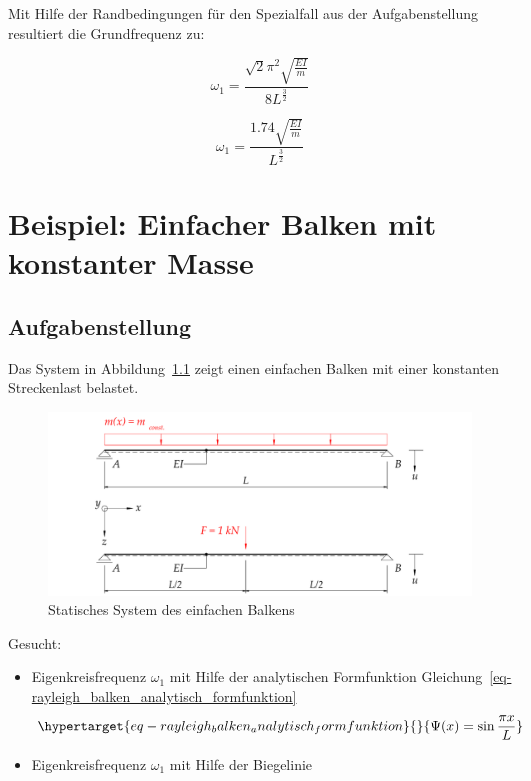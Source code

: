 \documentclass[
  letterpaper,
  DIV=11]{scrreprt}
\providecommand{\tightlist}{%
  \setlength{\itemsep}{0pt}\setlength{\parskip}{0pt}}\usepackage{longtable,booktabs,array}
\begin{document}
Mit Hilfe der Randbedingungen für den Spezialfall aus der
Aufgabenstellung resultiert die Grundfrequenz zu:

\begin{equation}\omega_{1} = \frac{\sqrt{2} \pi^{2} \sqrt{\frac{E I}{m}}}{8 L^{\frac{3}{2}}}\end{equation}

\begin{equation}\omega_{1} = \frac{1.74 \sqrt{\frac{E I}{m}}}{L^{\frac{3}{2}}}\end{equation}

\hypertarget{beispiel-einfacher-balken-mit-konstanter-masse}{%
\chapter{Beispiel: Einfacher Balken mit konstanter
Masse}\label{beispiel-einfacher-balken-mit-konstanter-masse}}

\hypertarget{aufgabenstellung-2}{%
\section{Aufgabenstellung}\label{aufgabenstellung-2}}

Das System in Abbildung~\ref{fig-rayleigh_balken_system} zeigt einen
einfachen Balken mit einer konstanten Streckenlast belastet.

\begin{figure}[H]

{\centering \includegraphics{index_files/mediabag/bilder/aufgabe_rayleigh_balken.pdf}

}

\caption{\label{fig-rayleigh_balken_system}Statisches System des
einfachen Balkens}

\end{figure}

Gesucht:

\begin{itemize}
\tightlist
\item
  Eigenkreisfrequenz \(\omega_1\) mit Hilfe der analytischen
  Formfunktion
  Gleichung~\ref{eq-rayleigh_balken_analytisch_formfunktion}
  \begin{equation}\protect\hypertarget{eq-rayleigh_balken_analytisch_formfunktion}{}{
  \Psi(x) = \sin{\frac{\pi x}{L}}
  }\label{eq-rayleigh_balken_analytisch_formfunktion}\end{equation}
\item
  Eigenkreisfrequenz \(\omega_1\) mit Hilfe der Biegelinie
\end{itemize}
\end{document}
